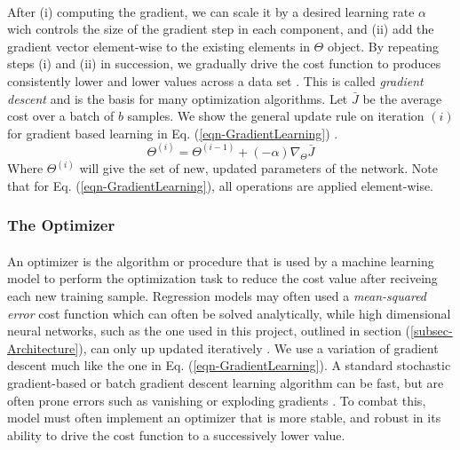 \documentclass[12pt,letterpaper]{article}
\begin{document}
\paragraph*{}After (i) computing the gradient, we can scale it by a desired learning rate $\alpha$ wich controls the size of the gradient step in each component, and (ii) add the gradient vector element-wise to the existing elements in $\Theta$ object. By repeating steps (i) and (ii) in succession, we gradually drive the cost function to produces consistently lower and lower values across a data set \cite{Geron}. This is called \textit{gradient descent} and is the basis for many optimization algorithms. Let $\bar{J}$ be the average cost over a batch of $b$ samples. We show the general update rule on iteration $(i)$ for gradient based learning in Eq. (\ref{eqn-GradientLearning}) \cite{Geron,Goodfellow}.
\begin{equation}
\label{eqn-GradientLearning}
\Theta^{(i)} = \Theta^{(i-1)} + (-\alpha) \nabla_{\Theta} \bar{J}
\end{equation}
Where $\Theta^{(i)}$ will give the set of new, updated parameters of the network. Note that for Eq. (\ref{eqn-GradientLearning}), all operations are applied element-wise.


\subsubsection{The Optimizer}
\label{subsubsec-Optimizer}

\paragraph*{}An optimizer is the algorithm or procedure that is used by a machine learning model to perform the optimization task to reduce the cost value after reciveing each new training sample. Regression models may often used a \textit{mean-squared error} cost function which can often be solved analytically, while high dimensional neural networks, such as the one used in this project, outlined in section (\ref{subsec-Architecture}), can only up updated iteratively \cite{Goodfellow,James,Loy}. We use a variation of gradient descent much like the one in Eq. (\ref{eqn-GradientLearning}). A standard stochastic gradient-based or batch gradient descent learning algorithm can be fast, but are often prone errors such as vanishing or exploding gradients \cite{Geron,Goodfellow,Loy}. To combat this, model must often implement an optimizer that is more stable, and robust in its ability to drive the cost function to a successively lower value.
\end{document}
